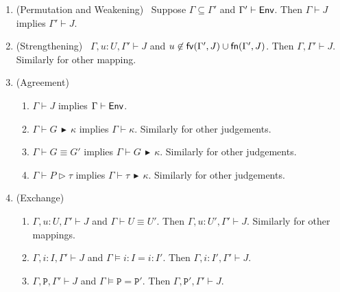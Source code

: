 \documentclass{LMCS}
\newcommand{\kf}[1]{\textup{\textsf{#1}}\xspace}
\newcommand{\G}{\ensuremath{G}}
\newcommand{\Ga}{\ensuremath{\Gamma}}
\newcommand{\fv}{\kf{fv}}
\newcommand{\fn}{\kf{fn}}
\newcommand{\ii}{\ensuremath{i}}
\newcommand{\II}{\ensuremath{I}}
\newcommand{\K}{\ensuremath{\kappa}}
\newcommand{\Ty}{\ensuremath{\tau}}
\newcommand{\Env}{\kf{Env}}
\newcommand{\RHD}{\,\ensuremath{\blacktriangleright}\,}
\newcommand{\AT}[2]{#1\! : \! #2}
\newcommand{\PRED}{\ensuremath{\mathtt{P}}}
\newcommand{\proves}{\vdash}                        \newcommand{\judg}{{J}}
\begin{document}
\begin{lem} \label{lem:basic}\hfill
\begin{enumerate}[\em(1)]
\item (Permutation and Weakening)\ 
\label{lem:per}
Suppose $\Ga \subseteq \Ga'$ and $\Ga'\proves \Env$. Then 
$\Gamma \proves \judg$ 
implies
$\Gamma' \proves \judg$.  

\item (Strengthening)\ 
\label{lem:st}
$\Gamma,\AT{u}{U},\Gamma' \proves \judg$ 
and $u\not\in \fv(\Gamma', \judg)\cup \fn(\Gamma', \judg)$. Then $\Gamma,\Gamma' \proves \judg$.
Similarly for other mapping. 

\item (Agreement)
\label{lem:agree}
\begin{enumerate}[\em(a)]
\item 
\label{lem:agreeEnv}
$\Gamma \proves J$ implies $\Gamma \proves \Env$. 
\item 
\label{lem:agreeK}
$\Gamma \proves \G \RHD \K$ implies 
$\Gamma \proves \K$. Similarly for other judgements. 

\item 
\label{lem:agreeEq}
$\Gamma \proves \G \equiv \G'$ implies 
$\Gamma \proves G \RHD \K$. Similarly for other judgements. 

\item 
\label{lem:agreeTy}
$\Gamma \proves P \rhd \Ty$ implies $\Gamma \proves \Ty \RHD \K$.
Similarly for other judgements. 
\end{enumerate}
\item (Exchange) 
\label{lem:agreeEx}
\begin{enumerate}[\em(a)] 
\item 
\label{lem:ExT}
$\Gamma,\AT{u}{U},\Gamma' \proves \judg$ and $\Gamma \proves U\equiv
U'$. Then $\Gamma,\AT{u}{U'},\Gamma' \proves \judg$. 
Similarly for other mappings. 
\item 
\label{lem:ExI}
$\Gamma,\AT{\ii}{\II},\Gamma' \proves \judg$ and $\Gamma\models
\AT{\ii}{\II}=
\AT{\ii}{\II'}$. Then 
$\Gamma,\AT{\ii}{\II'},\Gamma' \proves \judg$. 

\item 
\label{lem:ExP}
$\Gamma,\PRED,\Gamma' \proves \judg$ and $\Gamma\models
\PRED=\PRED'$. Then 
$\Gamma,\PRED',\Gamma' \proves \judg$. 
\end{enumerate}
\end{enumerate}
\end{lem}
\end{document}
